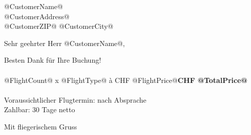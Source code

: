 \documentclass[RechnungTemplate]{scrlttr2}
\begin{document}
\begin{letter}
{@CustomerName@\\
@CustomerAddress@\\
@CustomerZIP@ @CustomerCity@
}
\opening{Sehr geehrter Herr @CustomerName@,}

Besten Dank für Ihre Buchung!\\
\\
@FlightCount@ x @FlightType@ à CHF @FlightPrice@\hfill \textbf{CHF @TotalPrice@}\\
\\
Voraussichtlicher Flugtermin: nach Absprache\\
Zahlbar: 30 Tage netto

\closing{Mit fliegerischem Gruss}
\end{letter}
\end{document}
